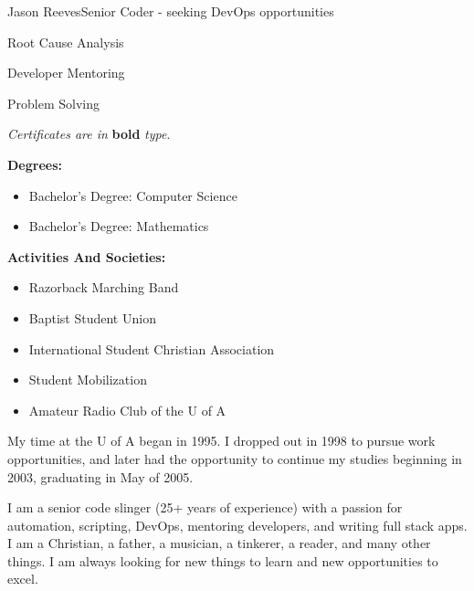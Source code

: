 \documentclass{article}
\begin{document}
\begin{cv}[avatar]{Jason Reeves}{Senior Coder - seeking DevOps opportunities}
\cvseparator
\begin{cvitem}
  \footnotesize Root Cause Analysis
\end{cvitem}

\cvseparator
\begin{cvitem}
  \footnotesize Developer Mentoring
\end{cvitem}

\cvseparator
\begin{cvitem}
  \footnotesize Problem Solving
\end{cvitem}

\begin{center}
  \footnotesize * \textit{Certificates are in} \textbf{bold} \textit{type}.
\end{center}
\vspace{-3mm}


\textbf{Degrees:}
\begin{itemize}
  \item Bachelor's Degree: Computer Science
  \item Bachelor's Degree: Mathematics
\end{itemize}
\vspace*{3mm}
\textbf{Activities And Societies:}
\begin{itemize}
  \item Razorback Marching Band
  \item Baptist Student Union
  \item International Student Christian Association
  \item Student Mobilization
  \item Amateur Radio Club of the U of A
\end{itemize}
\vspace*{3mm}
\begin{center}
\footnotesize My time at the U of A began in 1995. I dropped out in 1998 to pursue work opportunities, and later had the opportunity to continue my studies beginning in 2003, graduating in May of 2005.
\end{center}

\switchcolumn
\renewcommand{\iscvsidebar}{0}

I am a senior code slinger (25+ years of experience) with a passion for automation, scripting, DevOps, mentoring developers, and writing full stack apps. I am a Christian, a father, a musician, a tinkerer, a reader, and many other things. I am always looking for new things to learn and new opportunities to excel.
\vspace*{3mm}


\end{cv}
\end{document}

